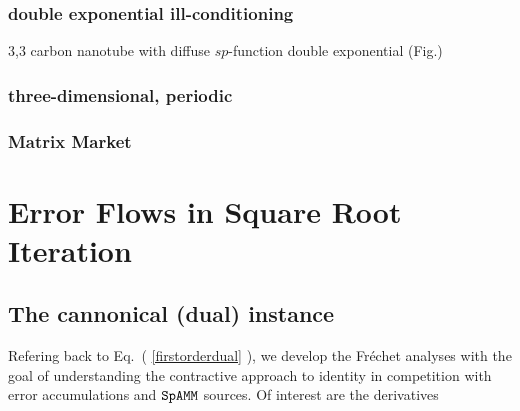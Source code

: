 \documentclass[letterpaper,twocolumn,amsmath,amsfont,amssymb,english,aps,jcp,preprintnumbers,groupaddress,nofootinbib,tightenlines,floatfix]{revtex4}
\newcommand{\mat}[1]{\boldsymbol{#1}}
\theoremstyle{plain}
\theoremstyle{remark}
\theoremstyle{plain}
\begin{document}
\subsubsection{double exponential ill-conditioning}
3,3 carbon nanotube with diffuse $sp$-function
double exponential (Fig.)

\subsubsection{three-dimensional, periodic}
\subsubsection{Matrix Market}

\section{Error Flows in Square Root Iteration}

\subsection{The cannonical (dual) instance}
 
Refering back to Eq.~( \ref{firstorderdual} ), we develop the Fr\'{e}chet analyses \cite{} with the goal of understanding
the contractive approach to identity in competition with error accumulations and $\tt SpAMM$ sources.
Of interest are the derivatives 

\end{document}
